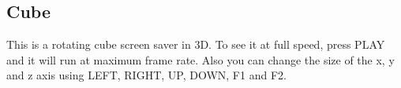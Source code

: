\subsection{Cube}

This is a rotating cube screen saver in 3D.
To see it at full speed, press PLAY and it will run at maximum frame rate. Also you can change the size of the x, y and z axis using  LEFT, RIGHT, UP, DOWN, F1 and F2.
